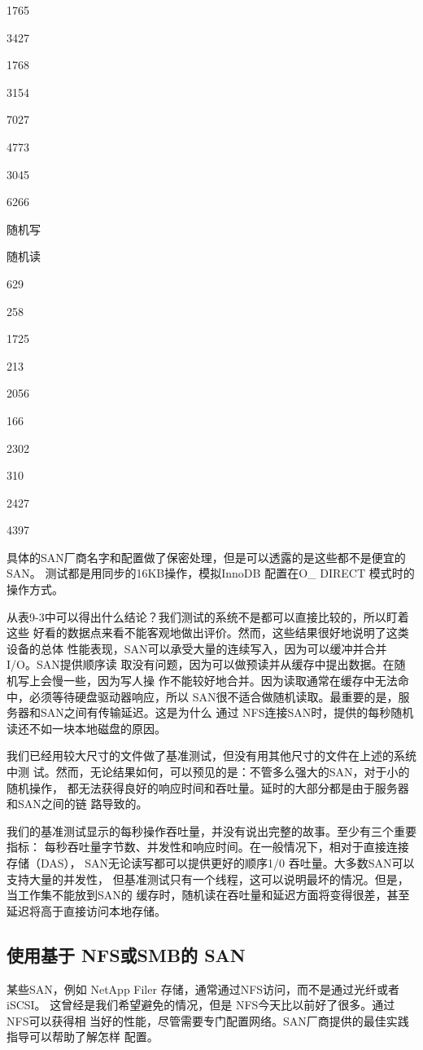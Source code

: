 1765

3427

1768

3154

7027

4773

3045

6266

随机写

随机读

629

258

1725

213

2056

166

2302

310

2427

4397

具体的SAN厂商名字和配置做了保密处理，但是可以透露的是这些都不是便宜的SAN。
测试都是用同步的16KB操作，模拟InnoDB 配置在O\_ DIRECT 模式时的操作方式。

从表9-3中可以得出什么结论？我们测试的系统不是都可以直接比较的，所以盯着这些
好看的数据点来看不能客观地做出评价。然而，这些结果很好地说明了这类设备的总体
性能表现，SAN可以承受大量的连续写入，因为可以缓冲并合并I/O。SAN提供顺序读
取没有问题，因为可以做预读并从缓存中提出数据。在随机写上会慢一些，因为写人操
作不能较好地合并。因为读取通常在缓存中无法命中，必须等待硬盘驱动器响应，所以
SAN很不适合做随机读取。最重要的是，服务器和SAN之间有传输延迟。这是为什么
通过 NFS连接SAN时，提供的每秒随机读还不如一块本地磁盘的原因。

我们已经用较大尺寸的文件做了基准测试，但没有用其他尺寸的文件在上述的系统中测
试。然而，无论结果如何，可以预见的是：不管多么强大的SAN，对于小的随机操作，
都无法获得良好的响应时间和吞吐量。延时的大部分都是由于服务器和SAN之间的链
路导致的。

我们的基准测试显示的每秒操作吞吐量，并没有说出完整的故事。至少有三个重要指标：
每秒吞吐量字节数、并发性和响应时间。在一般情况下，相对于直接连接存储（DAS），
SAN无论读写都可以提供更好的顺序1/0 吞吐量。大多数SAN可以支持大量的并发性，
但基准测试只有一个线程，这可以说明最坏的情况。但是，当工作集不能放到SAN的
缓存时，随机读在吞吐量和延迟方面将变得很差，甚至延迟将高于直接访问本地存储。

\subsection{使用基于 NFS或SMB的 SAN}
某些SAN，例如 NetApp Filer 存储，通常通过NFS访问，而不是通过光纤或者iSCSI。
这曾经是我们希望避免的情况，但是 NFS今天比以前好了很多。通过NFS可以获得相
当好的性能，尽管需要专门配置网络。SAN厂商提供的最佳实践指导可以帮助了解怎样
配置。

